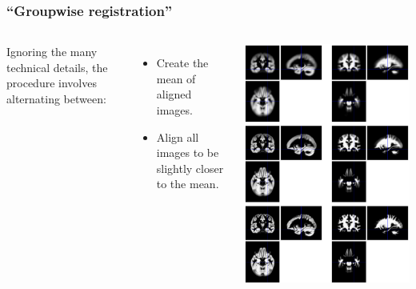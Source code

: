 \begin{frame}
\frametitle{``Groupwise registration''}
\begin{columns}[c]
Ignoring the many technical details, the procedure involves alternating between:
\begin{itemize}
\item Create the mean of aligned images.
\item Align all images to be slightly closer to the mean.
\end{itemize}
\begin{center}
\includegraphics[height=.8\textheight]{groupwiseII}
\end{center}
\end{columns}
\end{frame}

